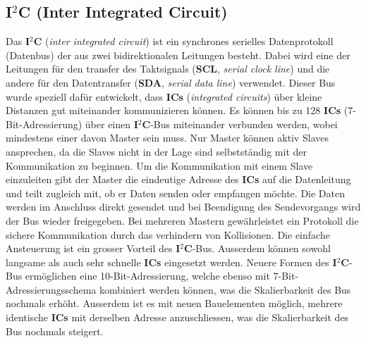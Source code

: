 \subsection{I$^{2}$C (Inter Integrated Circuit)}
\label{subsubsec:I2C}
Das \textbf{I$^{2}$C} (\textit{inter integrated circuit}) ist ein synchrones serielles Datenprotokoll (Datenbus) der aus zwei bidirektionalen Leitungen besteht. Dabei wird eine der Leitungen für den transfer des Taktsignals (\textbf{SCL}, \textit{serial clock line}) und die andere für den Datentransfer (\textbf{SDA}, \textit{serial data line}) verwendet. Dieser Bus wurde speziell dafür entwickelt, dass \textbf{ICs} (\textit{integrated circuits}) über kleine Distanzen gut miteinander kommunizieren können. Es können bis zu 128 \textbf{ICs} (7-Bit-Adressierung) über einen \textbf{I$^{2}$C}-Bus miteinander verbunden werden, wobei mindestens einer davon Master sein muss. Nur Master können aktiv Slaves ansprechen, da die Slaves nicht in der Lage sind selbstständig mit der Kommunikation zu beginnen. Um die Kommunikation mit einem Slave einzuleiten gibt der Master die eindeutige Adresse des \textbf{ICs} auf die Datenleitung und teilt zugleich mit, ob er Daten senden oder empfangen möchte. Die Daten werden im Anschluss direkt gesendet und bei Beendigung des Sendevorgangs wird der Bus wieder freigegeben. Bei mehreren Mastern gewährleistet ein Protokoll die sichere Kommunikation durch das verhindern von Kollisionen. Die einfache Ansteuerung ist ein grosser Vorteil des \textbf{I$^{2}$C}-Bus. Ausserdem können sowohl langsame als auch sehr schnelle \textbf{ICs} eingesetzt werden. Neuere Formen des \textbf{I$^{2}$C}-Bus ermöglichen eine 10-Bit-Adressierung, welche ebenso mit 7-Bit-Adressierungsschema kombiniert werden können, was die Skalierbarkeit des Bus nochmals erhöht. Ausserdem ist es mit neuen Bauelementen möglich, mehrere identische \textbf{ICs} mit derselben Adresse anzuschliessen, was die Skalierbarkeit des Bus nochmals steigert. \cite{mcI2C} \cite{rnI2C}\\